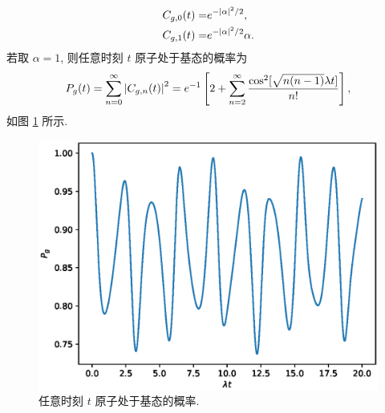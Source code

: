 \documentclass{assignment}
\begin{document}
\begin{sol}
\begin{align}
        C_{g,0}(t)=&e^{-\left\lvert\alpha\right\rvert^2/2},\\
        C_{g,1}(t)=&e^{-\left\lvert\alpha\right\rvert^2/2}\alpha.
    \end{align}
    若取 $\alpha=1$, 则任意时刻 $t$ 原子处于基态的概率为
    \begin{align}
        P_g(t)=\sum_{n=0}^{\infty}\left\lvert C_{g,n}(t)\right\rvert^2=e^{-1}\left[2+\sum_{n=2}^{\infty}\frac{\cos^2[\sqrt{n(n-1)}\lambda t]}{n!}\right],
    \end{align}
    如图 \ref{2014-8} 所示.
    \begin{figure}[H]
        \centering
        \includegraphics[width=.5\columnwidth]{Figures/2014-8.eps}
        \caption{任意时刻 $t$ 原子处于基态的概率.}
        \label{2014-8}
    \end{figure}
\end{sol}
\end{document}
